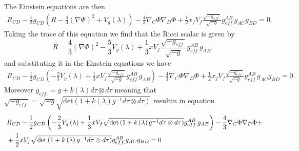 \documentclass[10 pt]{article}
\begin{document}
The Einstein equations are then
\begin{align}
R_{CD} - \frac{1}{2} g_{CD} \left( R - \frac{4}{3} {\left( \nabla \Phi \right)}^2 + V_g \left(\lambda\right) \right) - \frac{4}{3} \nabla_C \Phi \nabla_D \Phi + \frac{1}{2} x_f V_f \frac{\sqrt{-g_{eff.}}}{\sqrt{-g}} g_{eff.}^{AB} g_{AC} g_{BD} = 0.
\end{align}
Taking the trace of this equation we find that the Ricci scalar is given by
\begin{equation}
R = \frac{4}{3} {\left( \nabla \Phi \right)}^2 - \frac{5}{3} V_g \left( \lambda \right) + \frac{1}{3} x V_f \frac{\sqrt{-g_{eff.}}}{\sqrt{-g}} g_{eff.}^{AB} g_{AB},
\end{equation}
and substituting it in the Einstein equations we have
\begin{align}
R_{CD} - \frac{1}{2} g_{CD} \left(-\frac{2}{3} V_g \left(\lambda\right) + \frac{1}{3} x V_f \frac{\sqrt{-g_{eff.}}}{\sqrt{-g}} g_{eff.}^{AB} g_{AB} \right) - \frac{4}{3} \nabla_C \Phi \nabla_D \Phi + \frac{1}{2} x_f V_f \frac{\sqrt{-g_{eff.}}}{\sqrt{-g}} g_{eff.}^{AB} g_{AC} g_{BD} = 0.
\end{align}
Moreover $g_{eff.} = g + k\left( \lambda \right) d \tau \otimes d \tau$ meaning that $\sqrt{-g_{eff.}} = \sqrt{-g} \sqrt{\text{det} \left( 1+ k \left( \lambda \right) g^{-1} d \tau \otimes d \tau \right)}$ resultin in equation
\begin{align}
&R_{CD} - \frac{1}{2} g_{CD} \left( - \frac{2}{3} V_g \left( \lambda \right)  + \frac{1}{3} x V_f \sqrt{\text{det} \left( 1+ k \left( \lambda \right) g^{-1} d \tau \otimes d \tau \right)} g_{eff.}^{AB} g_{AB} \right) - \frac{4}{3} \nabla_C \Phi \nabla_D \Phi + \notag \\\ 
&+ \frac{1}{2} x V_f \sqrt{\text{det} \left( 1+ k \left( \lambda \right) g^{-1} d \tau \otimes d \tau \right)} g_{eff.}^{AB} g_{AC} g_{BD} = 0
\end{align}
\end{document}
